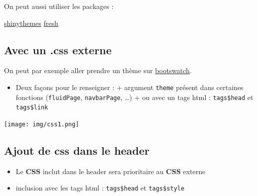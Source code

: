 \documentclass[
]{article}
\newenvironment{Shaded}{\begin{snugshade}}{\end{snugshade}}
\newcommand{\AttributeTok}[1]{\textcolor[rgb]{0.13,0.29,0.53}{#1}}
\newcommand{\CommentTok}[1]{\textcolor[rgb]{0.56,0.35,0.01}{\textit{#1}}}
\newcommand{\FunctionTok}[1]{\textcolor[rgb]{0.13,0.29,0.53}{\textbf{#1}}}
\newcommand{\NormalTok}[1]{#1}
\newcommand{\OtherTok}[1]{\textcolor[rgb]{0.56,0.35,0.01}{#1}}
\newcommand{\SpecialCharTok}[1]{\textcolor[rgb]{0.81,0.36,0.00}{\textbf{#1}}}
\newcommand{\StringTok}[1]{\textcolor[rgb]{0.31,0.60,0.02}{#1}}
\providecommand{\tightlist}{%
  \setlength{\itemsep}{0pt}\setlength{\parskip}{0pt}}
\begin{document}
On peut aussi utiliser les packages :

\href{http://rstudio.github.io/shinythemes}{shinythemes}
\href{https://dreamrs.github.io/fresh/}{fresh}

\hypertarget{avec-un-.css-externe}{%
\subsection{Avec un .css externe}\label{avec-un-.css-externe}}

On peut par exemple aller prendre un thème sur
\href{http://bootswatch.com/}{bootswatch}.

\begin{itemize}
\tightlist
\item
  Deux façons pour le renseigner : + argument \texttt{theme} présent
  dans certaines fonctions (\texttt{fluidPage}, \texttt{navbarPage},
  \ldots) + ou avec un tags html : \texttt{tags\$head} et
  \texttt{tags\$link}
\end{itemize}

\begin{Shaded}
\end{Shaded}

\texttt{[image: img/css1.png]}

\hypertarget{ajout-de-css-dans-le-header}{%
\subsection{Ajout de css dans le
header}\label{ajout-de-css-dans-le-header}}

\begin{itemize}
\tightlist
\item
  Le \textbf{CSS} inclut dans le header sera prioritaire au \textbf{CSS}
  externe
\item
  inclusion avec les tags html : \texttt{tags\$head} et
  \texttt{tags\$style}
\end{itemize}
\end{document}
